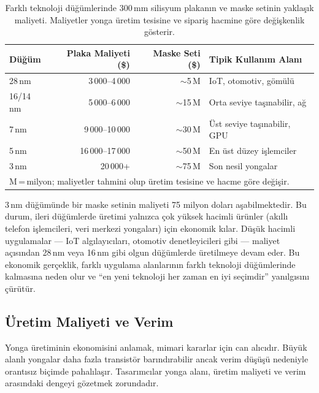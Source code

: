 \begin{table}[ht!]
\centering
\caption[Teknoloji düğümlerine göre üretim maliyetleri]{Farklı teknoloji düğümlerinde 300\,mm silisyum plakanın ve maske setinin yaklaşık maliyeti. Maliyetler yonga üretim tesisine ve sipariş hacmine göre değişkenlik gösterir.}
\label{tab:plaka-maliyetleri}
\footnotesize
\begin{tabular}{lrrl}
\toprule
\textbf{Düğüm} & \textbf{Plaka Maliyeti (\$)} & \textbf{Maske Seti (\$)} & \textbf{Tipik Kullanım Alanı} \\
\midrule
28\,nm    & 3\,000--4\,000     & ${\sim}$5\,M    & IoT, otomotiv, gömülü \\
16/14\,nm & 5\,000--6\,000     & ${\sim}$15\,M   & Orta seviye taşınabilir, ağ \\
7\,nm     & 9\,000--10\,000    & ${\sim}$30\,M   & Üst seviye taşınabilir, GPU \\
5\,nm     & 16\,000--17\,000   & ${\sim}$50\,M   & En üst düzey işlemciler \\
3\,nm     & 20\,000+           & ${\sim}$75\,M   & Son nesil yongalar \\
\bottomrule
\multicolumn{4}{l}{\scriptsize M\,=\,milyon; maliyetler tahmini olup üretim tesisine ve hacme göre değişir.}
\end{tabular}
\end{table}

3\,nm düğümünde bir maske setinin maliyeti 75 milyon doları aşabilmektedir. Bu durum, ileri düğümlerde üretimi yalnızca çok yüksek hacimli ürünler (akıllı telefon işlemcileri, veri merkezi yongaları) için ekonomik kılar. Düşük hacimli uygulamalar --- IoT algılayıcıları, otomotiv denetleyicileri gibi --- maliyet açısından 28\,nm veya 16\,nm gibi olgun düğümlerde üretilmeye devam eder. Bu ekonomik gerçeklik, farklı uygulama alanlarının farklı teknoloji düğümlerinde kalmasına neden olur ve ``en yeni teknoloji her zaman en iyi seçimdir'' yanılgısını çürütür.


\subsection{Üretim Maliyeti ve Verim}
\label{sec:maliyet-verim}

Yonga üretiminin ekonomisini anlamak, mimari kararlar için can alıcıdır. Büyük alanlı yongalar daha fazla transistör barındırabilir ancak verim düşüşü nedeniyle orantısız biçimde pahalılaşır. Tasarımcılar yonga alanı, üretim maliyeti ve verim arasındaki dengeyi gözetmek zorundadır.

